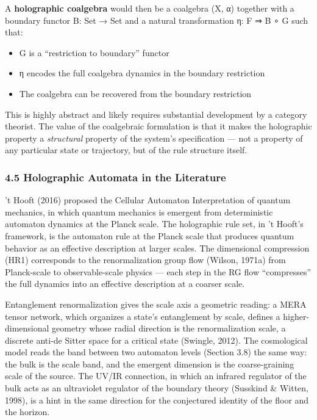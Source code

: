 \documentclass[
]{article}
\providecommand{\tightlist}{%
  \setlength{\itemsep}{0pt}\setlength{\parskip}{0pt}}
\begin{document}
A \textbf{holographic coalgebra} would then be a coalgebra (X, α)
together with a boundary functor B: Set → Set and a natural
transformation η: F ⇒ B ∘ G such that:

\begin{itemize}
\tightlist
\item
  G is a ``restriction to boundary'' functor
\item
  η encodes the full coalgebra dynamics in the boundary restriction
\item
  The coalgebra can be recovered from the boundary restriction
\end{itemize}

This is highly abstract and likely requires substantial development by a
category theorist. The value of the coalgebraic formulation is that it
makes the holographic property a \emph{structural} property of the
system's specification --- not a property of any particular state or
trajectory, but of the rule structure itself.

\hypertarget{holographic-automata-in-the-literature}{%
\subsubsection{4.5 Holographic Automata in the
Literature}\label{holographic-automata-in-the-literature}}

't Hooft (2016) proposed the Cellular Automaton Interpretation of
quantum mechanics, in which quantum mechanics is emergent from
deterministic automaton dynamics at the Planck scale. The holographic
rule set, in 't Hooft's framework, is the automaton rule at the Planck
scale that produces quantum behavior as an effective description at
larger scales. The dimensional compression (HR1) corresponds to the
renormalization group flow (Wilson, 1971a) from Planck-scale to
observable-scale physics --- each step in the RG flow ``compresses'' the
full dynamics into an effective description at a coarser scale.

Entanglement renormalization gives the scale axis a geometric reading: a
MERA tensor network, which organizes a state's entanglement by scale,
defines a higher-dimensional geometry whose radial direction is the
renormalization scale, a discrete anti-de Sitter space for a critical
state (Swingle, 2012). The cosmological model reads the band between two
automaton levels (Section 3.8) the same way: the bulk is the scale band,
and the emergent dimension is the coarse-graining scale of the source.
The UV/IR connection, in which an infrared regulator of the bulk acts as
an ultraviolet regulator of the boundary theory (Susskind \& Witten,
1998), is a hint in the same direction for the conjectured identity of
the floor and the horizon.
\end{document}
